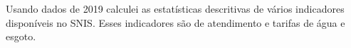 
Usando dados de 2019 calculei as estatísticas descritivas de vários indicadores disponíveis no SNIS. Esses indicadores são de atendimento e tarifas de água e esgoto.
















